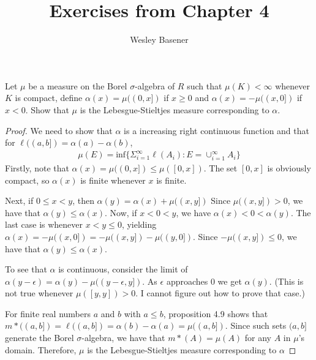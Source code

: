 \documentclass[10pt]{article}
\newenvironment{problem}[2][Problem]{\begin{trivlist}
		\item[\hskip \labelsep {\bfseries #1}\hskip \labelsep {\bfseries #2.}]}{\end{trivlist}}
\begin{document}
	
	\title{Exercises from Chapter 4}
	\author{Wesley Basener}
	\maketitle
	\begin{problem}{1}
		Let $\mu$ be a measure on the Borel $\sigma$-algebra of $R$ such that $\mu(K) < \infty$ whenever $K$ is compact, define $\alpha(x) = \mu((0, x])$ if $x \geq 0$ and $\alpha(x) = -\mu((x, 0])$ if $x < 0$. Show that $\mu$ is the Lebesgue-Stieltjes measure corresponding to $\alpha$.
		\begin{proof}
			We need to show that $\alpha$ is a increasing right continuous function and that for $\ell((a,b]) = \alpha(a) - \alpha(b)$,
			\begin{align*}
				\mu(E) = \text{inf}\{\Sigma_{i=1}^{\infty}\ell(A_i): E = \cup_{i=1}^{\infty}A_i\}
			\end{align*}
			Firstly, note that $\alpha(x) = \mu((0,x]) \leq \mu([0,x])$. The set $[0,x]$ is obviously compact, so $\alpha(x)$ is finite whenever $x$ is finite.
			
			Next, if $0 \leq x < y$, then $\alpha(y) = \alpha(x) + \mu((x,y])$ Since $\mu((x,y]) > 0$, we have that $\alpha(y) \leq \alpha(x)$. Now, if $x < 0 < y$, we have $\alpha(x) < 0 < \alpha(y)$. The last case is whenever $x<y\leq0$, yielding $\alpha(x) = -\mu((x,0]) = -\mu((x,y]) - \mu((y,0])$. Since $-\mu((x,y]) \leq 0$, we have that $\alpha(y) \leq \alpha(x)$.
			
			To see that $\alpha$ is continuous, consider the limit of $\alpha(y-\epsilon)=\alpha(y) - \mu((y-\epsilon, y])$. As $\epsilon$ approaches $0$ we get $\alpha(y)$. (This is not true whenever $\mu([y,y])>0$. I cannot figure out how to prove that case.)
			
			For finite real numbers $a$ and $b$ with $a\leq b$, proposition 4.9 shows that $m*((a,b]) = \ell((a,b]) = \alpha(b) - \alpha(a) = \mu((a,b])$. Since such sets $(a,b]$ generate the Borel $\sigma$-algebra, we have that $m*(A) = \mu(A)$ for any $A$ in $\mu$'s domain. Therefore, $\mu$ is the Lebesgue-Stieltjes measure corresponding to $\alpha$
		\end{proof}
	\end{problem}
	
\end{document}
